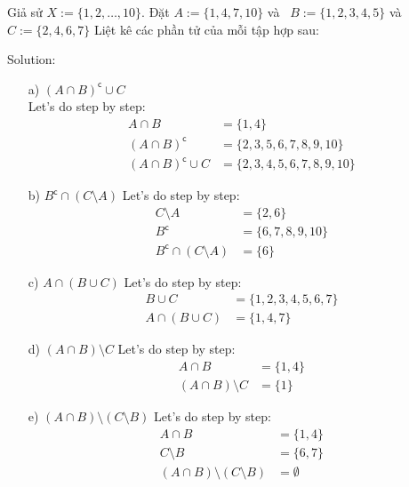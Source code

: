 \begin{longfbox}
      \begin{bt} \label{pro:practice1.1}
            Giả sử $X:=\{1,2,\dots, 10\}$. Đặt $A:=\{1,4,7,10\}$ và \ 
            $B:=\{1,2,3,4,5\}$ và $C:=\{2,4,6,7\}$
            Liệt kê các phần tử của mỗi tập hợp sau:
      \end{bt}
\end{longfbox}
  
Solution:
\begin{enumerate}
\item[a)] $(A\cap B)^\mathsf{c}\cup C$ \\
      Let's do step by step: 
      \begin{align}
            A\cap B &= \{1,4\} \\
            (A\cap B)^\mathsf{c} &= \{2,3,5,6,7,8,9,10\} \\
            (A\cap B)^\mathsf{c}\cup C &= \{2,3,4,5,6,7,8,9,10\}
      \end{align} 
\item[b)] $B^\mathsf{c}\cap(C\setminus A)$
      Let's do step by step: 
      \begin{align}
            C\setminus A &= \{2,6\} \\
            B^\mathsf{c} &= \{6,7,8,9,10\} \\
            B^\mathsf{c}\cap(C\setminus A) &= \{6\}
      \end{align} 
\item[c)] $A\cap(B\cup C)$
      Let's do step by step: 
      \begin{align}
            B\cup C &= \{1,2,3,4,5,6,7\} \\
            A\cap(B\cup C) &= \{1,4,7\}
      \end{align} 
\item[d)] $(A\cap B)\setminus C$
      Let's do step by step: 
      \begin{align}
            A\cap B &= \{1,4\} \\
            (A\cap B)\setminus C &= \{1\}
      \end{align} 
\item[e)] $(A\cap B)\setminus(C\setminus B)$
      Let's do step by step: 
      \begin{align}
            A\cap B &= \{1,4\} \\
            C\setminus B &= \{6,7\} \\
            (A\cap B)\setminus(C\setminus B) &= \emptyset
      \end{align} 
\end{enumerate}